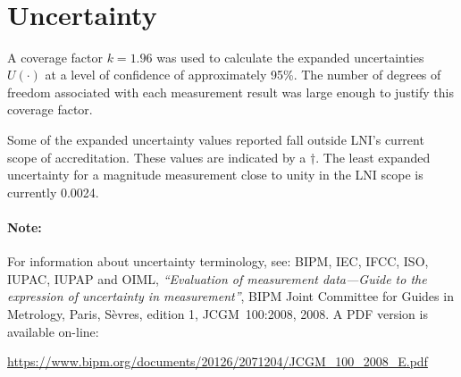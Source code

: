 \documentclass[11pt,a4paper]{article}
\newcommand{\referenceGUM}{
For information about uncertainty terminology, see: 
BIPM, IEC, IFCC, ISO, IUPAC, IUPAP and OIML, 
\textit{``Evaluation of measurement data---Guide to the expression of uncertainty in measurement''}, 
BIPM Joint Committee for Guides in Metrology, Paris, S\`evres, edition 1, JCGM~100:2008, 2008. 
A PDF version is available on-line:

\begin{center}
	\href{%
		https://www.bipm.org/documents/20126/2071204/JCGM_100_2008_E.pdf
	}{%
		https://www.bipm.org/documents/20126/2071204/JCGM\_100\_2008\_E.pdf
	}
\end{center}
}
\begin{document}
\begin{center}
\begin{singlespace}
\[\begin{array}{SSSSS}
		\end{array}
	\]
	
\end{singlespace}
\end{center}


\section{Uncertainty}
A coverage factor $k=1.96$ was used to calculate the expanded uncertainties $U(\cdot)$ at a level of confidence of approximately 95\%. The number of degrees of freedom associated with each measurement result was large enough to justify this coverage factor.  

Some of the expanded uncertainty values reported fall outside LNI's current scope of accreditation. These values are indicated by a $\dagger$. The least expanded uncertainty for a magnitude measurement close to unity in the LNI scope is currently 0.0024. 

\paragraph{Note:} \referenceGUM	%
\end{document}
